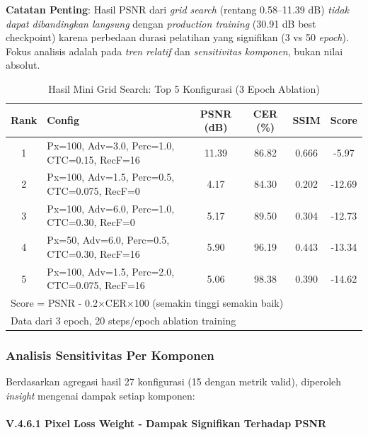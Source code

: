 \documentclass[12pt,a4paper]{article}
\begin{document}
\textbf{Catatan Penting}: Hasil PSNR dari \textit{grid search} (rentang 0.58--11.39 dB) \textit{tidak dapat dibandingkan langsung} dengan \textit{production training} (30.91 dB best checkpoint) karena perbedaan durasi pelatihan yang signifikan (3 vs 50 \textit{epoch}). Fokus analisis adalah pada \textit{tren relatif} dan \textit{sensitivitas komponen}, bukan nilai absolut.

\begin{table}[H]
\centering
\caption{Hasil Mini Grid Search: Top 5 Konfigurasi (3 Epoch Ablation)}
\label{tab:grid-search-top5}
\footnotesize
\begin{tabular}{clcccc}
\hline
\textbf{Rank} & \textbf{Config} & \textbf{PSNR (dB)} & \textbf{CER (\%)} & \textbf{SSIM} & \textbf{Score} \\
\hline
1 & Px=100, Adv=3.0, Perc=1.0, CTC=0.15, RecF=16 & 11.39 & 86.82 & 0.666 & -5.97 \\
2 & Px=100, Adv=1.5, Perc=0.5, CTC=0.075, RecF=0 & 4.17 & 84.30 & 0.202 & -12.69 \\
3 & Px=100, Adv=6.0, Perc=1.0, CTC=0.30, RecF=0 & 5.17 & 89.50 & 0.304 & -12.73 \\
4 & Px=50, Adv=6.0, Perc=0.5, CTC=0.30, RecF=16 & 5.90 & 96.19 & 0.443 & -13.34 \\
5 & Px=100, Adv=1.5, Perc=2.0, CTC=0.075, RecF=16 & 5.06 & 98.38 & 0.390 & -14.62 \\
\hline
\multicolumn{6}{l}{\footnotesize Score = PSNR - 0.2×CER×100 (semakin tinggi semakin baik)} \\
\multicolumn{6}{l}{\footnotesize Data dari 3 epoch, 20 steps/epoch ablation training} \\
\end{tabular}
\end{table}

\subsubsection{Analisis Sensitivitas Per Komponen}
\label{subsubsec:analisis-sensitivitas-komponen}

Berdasarkan agregasi hasil 27 konfigurasi (15 dengan metrik valid), diperoleh \textit{insight} mengenai dampak setiap komponen:

\paragraph{V.4.6.1 Pixel Loss Weight - Dampak Signifikan Terhadap PSNR}
\end{document}
